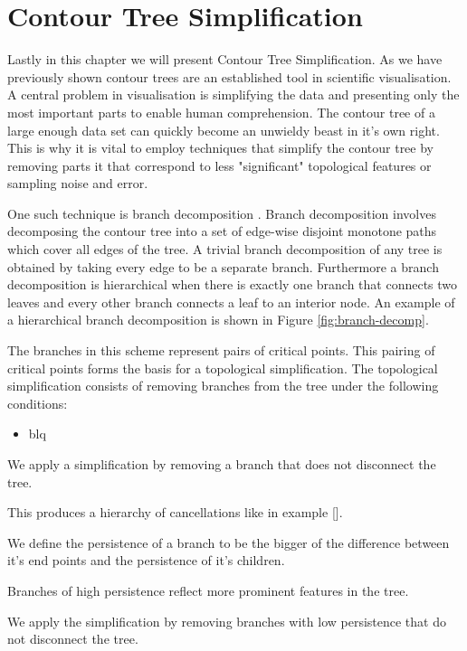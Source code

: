 \section{Contour Tree Simplification}

Lastly in this chapter we will present Contour Tree Simplification. As we have previously shown contour trees are an established tool in scientific visualisation. A central problem in visualisation is simplifying the data and presenting only the most important parts to enable human comprehension. The contour tree of a large enough data set can quickly become an unwieldy beast in it's own right. This is why it is vital to employ techniques that simplify the contour tree by removing parts it that correspond to less "significant" topological features or sampling noise and error.

One such technique is branch decomposition \cite{ct-branch-decomp}. Branch decomposition involves decomposing the contour tree into a set of edge-wise disjoint monotone paths which cover all edges of the tree. A trivial branch decomposition of any tree is obtained by taking every edge to be a separate branch. Furthermore a branch decomposition is hierarchical when there is exactly one branch that connects two leaves and every other branch connects a leaf to an interior node. An example of a hierarchical branch decomposition is shown in Figure \ref{fig:branch-decomp}.

The branches in this scheme represent pairs of critical points. This pairing of critical points forms the basis for a topological simplification. The topological simplification consists of removing branches from the tree under the following conditions:

\begin{itemize}
    \item blq
\end{itemize}

We apply a simplification by removing a branch that does not disconnect the tree. 

This produces a hierarchy of cancellations like in example []. 

We define the persistence of a branch to be the bigger of the difference between it's end points and the persistence of it's children. 

Branches of high persistence reflect more prominent features in the tree. 

We apply the simplification by removing branches with low persistence that do not disconnect the tree.

